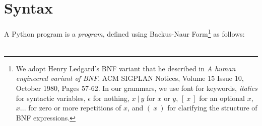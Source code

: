 \section{Syntax}

A Python program is a \emph{program}, defined using Backus-Naur Form\footnote{
  We adopt Henry Ledgard's BNF variant that he described in
  \emph{A human engineered variant of BNF}, ACM SIGPLAN Notices,
  Volume 15 Issue 10,
  October 1980, Pages 57-62. In our grammars, we use
   font for keywords,
  {\it italics} for syntactic variables, $\epsilon$ for nothing,
  $x\ |\ y$ for $x$ or $y$, $[\ x\ ]$ for an optional $x$,
  $ x ...$ for zero or more repetitions of $x$, and $(\ x\ )$ for
clarifying the structure of BNF expressions.}
as follows:

\[\begin{array}{rcll}


\end{array}\]
